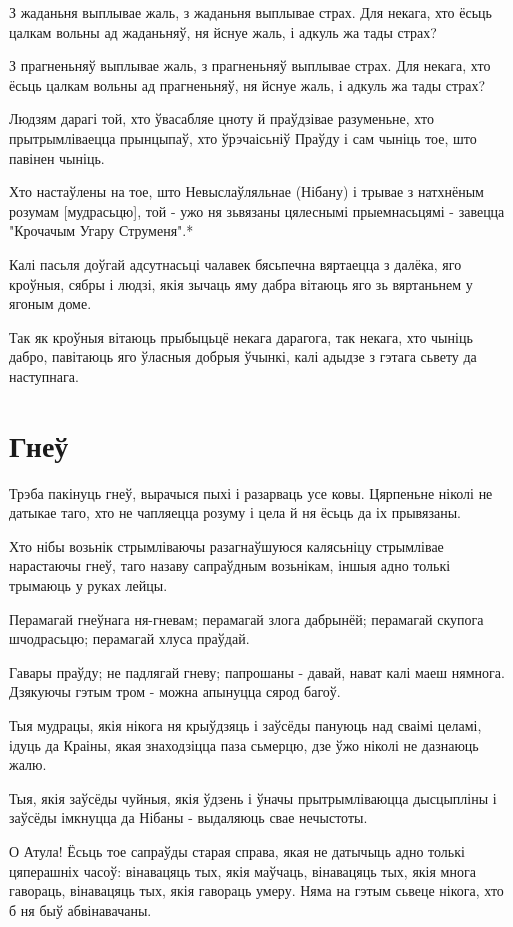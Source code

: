 \documentclass{article}
\begin{document}
З жаданьня выплывае жаль, з жаданьня выплывае страх. Для некага,
хто ёсьць цалкам вольны ад жаданьняў, ня йснуе жаль, і адкуль жа тады
страх?

З прагненьняў выплывае жаль, з прагненьняў выплывае страх. Для
некага, хто ёсьць цалкам вольны ад прагненьняў, ня йснуе жаль, і адкуль
жа тады страх?

Людзям дарагі той, хто ўвасабляе цноту й праўдзівае разуменьне, хто
прытрымліваецца прынцыпаў, хто ўрэчаісьніў Праўду і сам чыніць тое, што
павінен чыніць.

Хто настаўлены на тое, што Невыслаўляльнае (Нібану) і трывае з
натхнёным розумам {[}мудрасьцю{]}, той - ужо ня зьвязаны цялеснымі
прыемнасьцямі - завецца "Крочачым Угару Струменя".*

Калі пасьля доўгай адсутнасьці чалавек бясьпечна вяртаецца з
далёка, яго кроўныя, сябры і людзі, якія зычаць яму дабра вітаюць яго зь
вяртаньнем у ягоным доме.

Так як кроўныя вітаюць прыбыцьцё некага дарагога, так некага, хто
чыніць дабро, павітаюць яго ўласныя добрыя ўчынкі, калі адыдзе з гэтага
сьвету да наступнага.

\section{Гнеў}

Трэба пакінуць гнеў, вырачыся пыхі і разарваць усе ковы. Цярпеньне
ніколі не датыкае таго, хто не чапляецца розуму і цела й ня ёсьць да іх
прывязаны.

Хто нібы возьнік стрымліваючы разагнаўшуюся калясьніцу стрымлівае
нарастаючы гнеў, таго назаву сапраўдным возьнікам, іншыя адно толькі
трымаюць у руках лейцы.

Перамагай гнеўнага ня-гневам; перамагай злога дабрынёй; перамагай
скупога шчодрасьцю; перамагай хлуса праўдай.

Гавары праўду; не падлягай гневу; папрошаны - давай, нават калі
маеш нямнога. Дзякуючы гэтым тром - можна апынуцца сярод багоў.

Тыя мудрацы, якія нікога ня крыўдзяць і заўсёды пануюць над сваімі
целамі, ідуць да Краіны, якая знаходзіцца паза сьмерцю, дзе ўжо ніколі
не дазнаюць жалю.

Тыя, якія заўсёды чуйныя, якія ўдзень і ўначы прытрымліваюцца
дысцыпліны і заўсёды імкнуцца да Нібаны - выдаляюць свае нечыстоты.

О Атула! Ёсьць тое сапраўды старая справа, якая не датычыць адно
толькі цяперашніх часоў: вінавацяць тых, якія маўчаць, вінавацяць тых,
якія многа гавораць, вінавацяць тых, якія гавораць умеру. Няма на гэтым
сьвеце нікога, хто б ня быў абвінавачаны.
\end{document}
